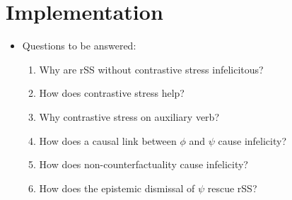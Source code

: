 \section{Implementation}
\begin{frame}[t]
\sectionpage\vskip 18pt
    \begin{itemize}
        \item<1-> Questions to be answered:\vskip 18pt
            \begin{enumerate}
                \item<2-> Why are rSS without contrastive stress infelicitous?\vskip 9pt
                \item<2-> How does contrastive stress help?\vskip 9pt
                \item<2-> Why contrastive stress on auxiliary verb?\vskip 9pt
                \item<3-> How does a causal link between {\color{red}$\phi$} and {\color{Orange}$\psi$} cause infelicity?\vskip 9pt
                \item<3-> How does non-counterfactuality cause infelicity?\vskip 9pt
                \item<4-> How does the epistemic dismissal of {\color{Orange}$\psi$} rescue rSS?
            \end{enumerate}
	\end{itemize}
\end{frame}

